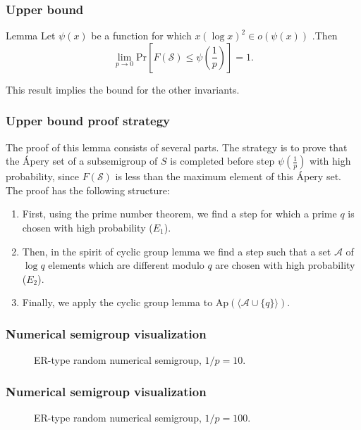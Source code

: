 \documentclass{beamer}
\def\Pr{\ensuremath{\mathrm{Pr}}}
\begin{document}

\begin{frame}
    \frametitle{Upper bound}
    \begin{block}{Lemma}
        Let $\psi(x)$ be a function for which $x(\log x)^2 \in o(\psi(x))$ .Then
        \[\lim_{p \to 0}\Pr\left[F(\mathcal{S}) \leq \psi\left(\frac{1}{p}\right)\right] = 1.\] 
    \end{block}
    This result implies the bound for the other invariants.
\end{frame}

\begin{frame}
    \frametitle{Upper bound proof strategy}
    The proof of this lemma consists of several parts. The strategy is to prove that the Ápery set of a subsemigroup of $S$ is completed before step $\psi\left(\frac{1}{p}\right)$ with high probability, since $F(\mathcal{S})$ is less than the maximum element of this Ápery set. The proof has the following structure: 
\begin{enumerate}
\item First, using the prime number theorem, we find a step for which a prime $q$ is chosen with high probability ($E_1$). 
\item Then, in the spirit of cyclic group lemma we find a step such that a set $\mathcal{A}$ of $\log q$ elements which are different modulo $q$ are chosen with high probability ($E_2$). 
\item Finally, we apply the cyclic group lemma to $\mathrm{Ap}(\langle \mathcal{A} \cup \{q\}\rangle)$.
\end{enumerate}
    
\end{frame}
\begin{frame}
    \frametitle{Numerical semigroup visualization}
    \begin{figure}
        \begin{center}
            \scalebox{0.8}{}
        \end{center}
        \caption{ER-type random numerical semigroup, $1/p = 10$.}
    \end{figure}

\end{frame}

\begin{frame}
    \frametitle{Numerical semigroup visualization}
    \begin{figure}
        \begin{center}
            \scalebox{0.8}{}
        \end{center}
        \caption{ER-type random numerical semigroup, $1/p = 100$.}
    \end{figure}

\end{frame}
\end{document}
